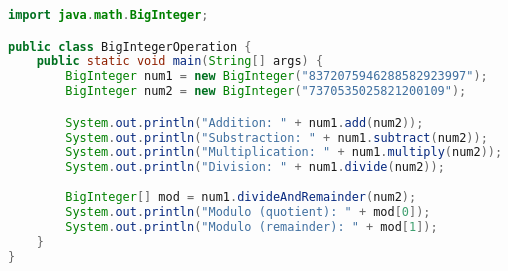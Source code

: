 \begin{table}[H]
	\centering
	\caption{BigInteger / BigDecimal类常用方法}
\end{table}


\begin{lstlisting}[language=Java]
import java.math.BigInteger;

public class BigIntegerOperation {
    public static void main(String[] args) {
        BigInteger num1 = new BigInteger("8372075946288582923997");
        BigInteger num2 = new BigInteger("7370535025821200109");

        System.out.println("Addition: " + num1.add(num2));
        System.out.println("Substraction: " + num1.subtract(num2));
        System.out.println("Multiplication: " + num1.multiply(num2));
        System.out.println("Division: " + num1.divide(num2));
        
        BigInteger[] mod = num1.divideAndRemainder(num2);
        System.out.println("Modulo (quotient): " + mod[0]);
        System.out.println("Modulo (remainder): " + mod[1]);
    }
}
\end{lstlisting}

